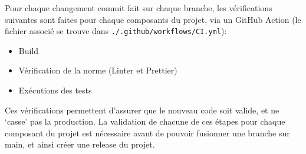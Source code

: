 Pour chaque changement commit fait sur chaque branche, les vérifications suivantes sont faites pour chaque composants du projet, via un GitHub Action (le fichier associé se trouve dans \verb|./.github/workflows/CI.yml|):

\begin{itemize}
	\item Build
	\item Vérification de la norme (Linter et Prettier)
	\item Exécutions des tests
\end{itemize}


Ces vérifications permettent d’assurer que le nouveau code soit valide, et ne ‘casse’ pas la production.
La validation de chacune de ces étapes pour chaque composant du projet est nécessaire avant de pouvoir fusionner une branche sur main, et ainsi créer une release du projet.